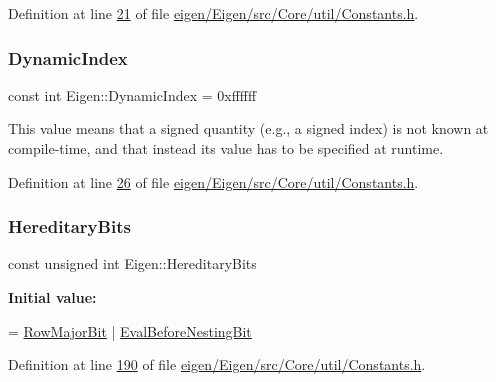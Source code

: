 Definition at line \hyperlink{eigen_2_eigen_2src_2_core_2util_2_constants_8h_source_l00021}{21} of file \hyperlink{eigen_2_eigen_2src_2_core_2util_2_constants_8h_source}{eigen/\+Eigen/src/\+Core/util/\+Constants.\+h}.

\mbox{\label{namespace_eigen_a73c597189a4a99127175e8167c456fff}} 
\subsubsection{\texorpdfstring{Dynamic\+Index}{DynamicIndex}}
{\footnotesize\ttfamily const int Eigen\+::\+Dynamic\+Index = 0xffffff}

This value means that a signed quantity (e.\+g., a signed index) is not known at compile-\/time, and that instead its value has to be specified at runtime. 

Definition at line \hyperlink{eigen_2_eigen_2src_2_core_2util_2_constants_8h_source_l00026}{26} of file \hyperlink{eigen_2_eigen_2src_2_core_2util_2_constants_8h_source}{eigen/\+Eigen/src/\+Core/util/\+Constants.\+h}.

\mbox{\label{namespace_eigen_a297729d26fa056b10e9d8d5d088b12e6}} 
\subsubsection{\texorpdfstring{Hereditary\+Bits}{HereditaryBits}}
{\footnotesize\ttfamily const unsigned int Eigen\+::\+Hereditary\+Bits}

{\bfseries Initial value\+:}
\begin{DoxyCode}
= \hyperlink{group__flags_gae4f56c2a60bbe4bd2e44c5b19cbe8762}{RowMajorBit}
                                  | \hyperlink{group__flags_gaa34e83bae46a8eeae4e69ebe3aaecbed}{EvalBeforeNestingBit}
\end{DoxyCode}


Definition at line \hyperlink{eigen_2_eigen_2src_2_core_2util_2_constants_8h_source_l00190}{190} of file \hyperlink{eigen_2_eigen_2src_2_core_2util_2_constants_8h_source}{eigen/\+Eigen/src/\+Core/util/\+Constants.\+h}.

\mbox{\label{namespace_eigen_a3163430a1c13173faffde69016b48aaf}} 
